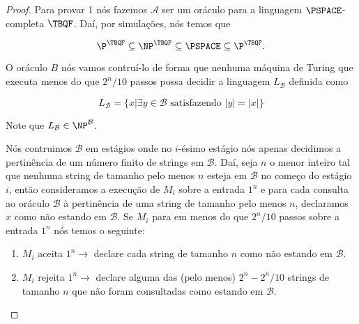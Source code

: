 \begin{proof}

Para provar 1 nós fazemos $\mathcal{A}$ ser um oráculo para a linguagem $\PSPACE$-completa $\TBQF$. Daí, por simulações, nós temos que

\begin{equation*}
	\P^{\TBQF} \subseteq \NP^{\TBQF} \subseteq \PSPACE \subseteq \P^{\TBQF}.
\end{equation*}

O oráculo $B$ nós vamos contruí-lo de forma que nenhuma máquina de Turing que executa menos do que $2^{n}/10$ passos possa decidir a linguagem $L_{\mathcal{B}}$ definida como

\begin{equation*}
    L_{\mathcal{B}} = \{x \lvert \exists y \in \mathcal{B} \text{ satisfazendo } \lvert y \rvert = \lvert x \rvert \}
\end{equation*}

Note que $L_{\mathcal{B}} \in \NP^{\mathcal{B}}$.

Nós contruimos $\mathcal{B}$ em estágios onde no $i$-ésimo estágio nós apenas decidimos a pertinência de um número finito de strings em $\mathcal{B}$. Daí, seja $n$ o menor inteiro tal que nenhuma string de tamanho pelo menos $n$ esteja em $\mathcal{B}$ no começo do estágio $i$, então consideramos a execução de $M_{i}$ sobre a entrada $1^{n}$ e para cada consulta ao oráculo $\mathcal{B}$ à pertinência de uma string de tamanho pelo menos $n$, declaramos $x$ como não estando em $\mathcal{B}$. Se $M_{i}$ para em menos do que $2^{n}/10$ passos sobre a entrada $1^{n}$ nós temos o seguinte:

\begin{enumerate}

    \item $M_{i}$ aceita $1^{n} \rightarrow$ declare cada string de tamanho $n$ como não estando em $\mathcal{B}$.

    \item $M_{i}$ rejeita $1^{n} \rightarrow$ declare alguma das (pelo menos) $2^{n} - 2^{n}/10$ strings de tamanho $n$ que não foram consultadas como estando em $\mathcal{B}$.

\end{enumerate} 

\end{proof}


